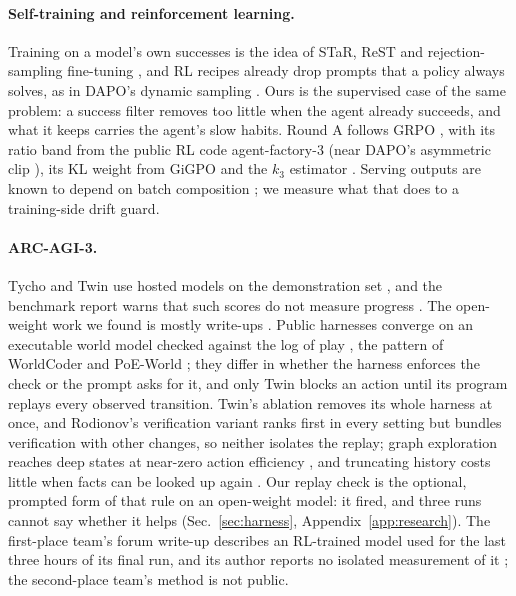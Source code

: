 \paragraph{Self-training and reinforcement learning.}
Training on a model's own successes is the idea of STaR, ReST and rejection-sampling fine-tuning \citep{zelikman2022star,gulcehre2023rest,yuan2023rft}, and RL recipes already drop prompts that a policy always solves, as in DAPO's dynamic sampling \citep{yu2025dapo}.
Ours is the supervised case of the same problem: a success filter removes too little when the agent already succeeds, and what it keeps carries the agent's slow habits.
Round A follows GRPO \citep{shao2024deepseekmath}, with its ratio band from the public RL code agent-factory-3 (near DAPO's asymmetric clip \citep{yu2025dapo}), its KL weight from GiGPO \citep{feng2025gigpo} and the $k_3$ estimator \citep{schulman2020klapprox}. %
Serving outputs are known to depend on batch composition \citep{he2025nondeterminism,yuan2025numerical}; we measure what that does to a training-side drift guard.


\paragraph{ARC-AGI-3.}
Tycho and Twin use hosted models on the demonstration set \citep{lehmann2026tycho,skoutnev2026twin}, and the benchmark report warns that such scores do not measure progress \citep{arcprize2026arcagi3}.
The open-weight work we found is mostly write-ups \citep{bessis2026duck,franzen2026writeup}.
Public harnesses converge on an executable world model checked against the log of play \citep{skoutnev2026twin,lehmann2026tycho,wu2026kepler,gowtham2026arcskill,rodionov2026ablation}, the pattern of WorldCoder and PoE-World \citep{tang2024worldcoder,piriyakulkij2025poeworld}; they differ in whether the harness enforces the check or the prompt asks for it, and only Twin blocks an action until its program replays every observed transition. %
Twin's ablation removes its whole harness at once, and Rodionov's verification variant ranks first in every setting but bundles verification with other changes, so neither isolates the replay; graph exploration reaches deep states at near-zero action efficiency \citep{rudakov2025graph}, and truncating history costs little when facts can be looked up again \citep{lencevicius2026persistgym}. %
Our replay check is the optional, prompted form of that rule on an open-weight model: it fired, and three runs cannot say whether it helps (Sec.~\ref{sec:harness}, Appendix~\ref{app:research}). %
The first-place team's forum write-up describes an RL-trained model used for the last three hours of its final run, and its author reports no isolated measurement of it \citep{chen2026forum755795}; the second-place team's method is not public. %

